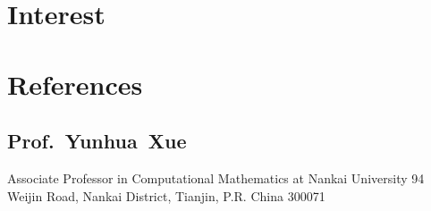\documentclass[10pt,a4paper,final]{moderncv}
\begin{document}
\section{\textbf{Interest}}
\section{\textbf{References}}
	\subsection{\textbf{Prof.~Yunhua~Xue}}
		\cvline{}
		{Associate Professor in Computational Mathematics at Nankai University}
		{94 Weijin Road, Nankai District, Tianjin, P.R. China 300071}
\end{document}
